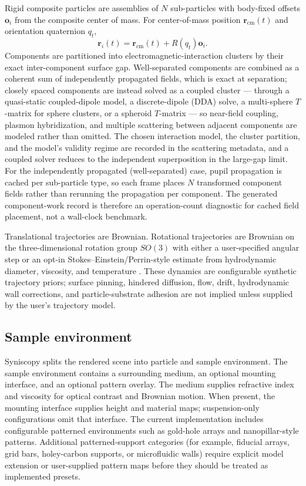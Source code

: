 Rigid composite particles are assemblies of $N$ sub-particles with body-fixed offsets $\mathbf{o}_i$ from the composite center of mass. For center-of-mass position $\mathbf{r}_{\mathrm{cm}}(t)$ and orientation quaternion $q_t$,
\begin{equation}
  \mathbf{r}_i(t)=\mathbf{r}_{\mathrm{cm}}(t)+R(q_t)\mathbf{o}_i .
\end{equation}
Components are partitioned into electromagnetic-interaction clusters by their exact inter-component surface gap. Well-separated components are combined as a coherent sum of independently propagated fields, which is exact at separation; closely spaced components are instead solved as a coupled cluster --- through a quasi-static coupled-dipole model, a discrete-dipole (DDA) solve, a multi-sphere $T$-matrix for sphere clusters, or a spheroid $T$-matrix --- so near-field coupling, plasmon hybridization, and multiple scattering between adjacent components are modeled rather than omitted. The chosen interaction model, the cluster partition, and the model's validity regime are recorded in the scattering metadata, and a coupled solver reduces to the independent superposition in the large-gap limit. For the independently propagated (well-separated) case, pupil propagation is cached per sub-particle type, so each frame places $N$ transformed component fields rather than rerunning the propagation per component. The generated component-work record is therefore an operation-count diagnostic for cached field placement, not a wall-clock benchmark.

Translational trajectories are Brownian. Rotational trajectories are Brownian on the three-dimensional rotation group $SO(3)$ with either a user-specified angular step or an opt-in Stokes--Einstein/Perrin-style estimate from hydrodynamic diameter, viscosity, and temperature \cite{stokes-einstein,rotational-diffusion}. These dynamics are configurable synthetic trajectory priors; surface pinning, hindered diffusion, flow, drift, hydrodynamic wall corrections, and particle-substrate adhesion are not implied unless supplied by the user's trajectory model.

\subsection{Sample environment}
\label{sec:substrate}

Syniscopy splits the rendered scene into particle and sample environment. The sample environment contains a surrounding medium, an optional mounting interface, and an optional pattern overlay. The medium supplies refractive index and viscosity for optical contrast and Brownian motion. When present, the mounting interface supplies height and material maps; suspension-only configurations omit that interface. The current implementation includes configurable patterned environments such as gold-hole arrays and nanopillar-style patterns. Additional patterned-support categories (for example, fiducial arrays, grid bars, holey-carbon supports, or microfluidic walls) require explicit model extension or user-supplied pattern maps before they should be treated as implemented presets.

